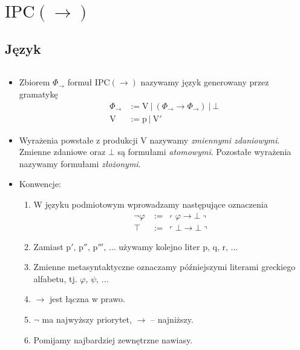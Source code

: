 \section{\(\mathrm{IPC}(\rightarrow)\)}
\subsection{Język}

\begin{definicja}$ $\newline
  \begin{itemize}
    \item  Zbiorem \(\Phi_{\to}\) formuł \(\mathrm{IPC}(\rightarrow)\) nazywamy język generowany przez gramatykę
    \begin{align*}
      \Phi_{\to} &:= \mathrm{V}\ |\ \left ( \Phi_{\to} \rightarrow \Phi_{\to} \right )\ |\ \bot\\
    \mathrm{V} &:= \mathrm{p}\ |\ \mathrm{V'}
    \end{align*}

    \item Wyrażenia powstałe z produkcji V nazywamy \emph{zmiennymi zdaniowymi}. Zmienne zdaniowe oraz \(\bot\) są formułami \emph{atomowymi}. Pozostałe wyrażenia nazywamy formułami \emph{złożonymi}.


\item  Konwencje: \begin{enumerate}
    \item W języku podmiotowym wprowadzamy następujące oznaczenia
    \begin{align*}
      \lnot \varphi &:=\ \left\ulcorner\varphi\rightarrow\bot\right\urcorner\\
      \top &:=\ \left\ulcorner\bot\rightarrow\bot\right\urcorner
    \end{align*}

    \item Zamiast \(\mathrm{p'},\, \mathrm{p''},\, \mathrm{p'''},\, \dots\) używamy kolejno liter \(\mathrm{p},\, \mathrm{q},\, \mathrm{r},\, \dots\)
    \item Zmienne metasyntaktyczne oznaczamy późniejszymi literami greckiego alfabetu, tj. \(\varphi,\, \psi,\, \dots\)
    \item \(\rightarrow\) jest łączna w prawo.
    \item \(\lnot\) ma najwyższy priorytet, \(\rightarrow\) – najniższy.
    \item Pomijamy najbardziej zewnętrzne nawiasy.
  \end{enumerate}


\end{itemize}
\end{definicja}
